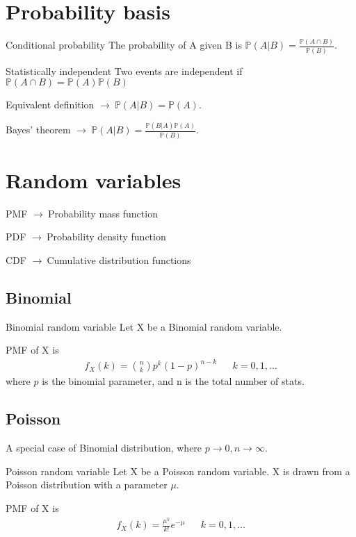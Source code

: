 \documentclass[11pt,a4paper]{article}
\numberwithin{equation}{section}
\newcommand{\prob}{\mathbb{P}}
\newcommand{\g}{$\rightarrow\ $}
\begin{document}
\clearpage


\section{Probability basis}

\begin{fact}{Conditional probability}{}
  The probability of A given B is $\prob(A|B) = \frac{\prob(A\cap B)}{\prob(B)}$.
\end{fact}

\begin{fact}{Statistically independent}{}
  Two events are independent if $\prob(A\cap B) = \prob(A)\prob(B)$
\end{fact}

Equivalent definition \g $\prob(A|B) = \prob(A)$.

\begin{fact}{Bayes’ theorem}{}
  \g $\prob(A|B) = \frac{\prob (B|A)\prob(A)}{\prob(B)}$.
\end{fact}

\section{Random variables}

PMF \g Probability mass function

PDF \g Probability density function

CDF \g Cumulative distribution functions

\subsection{Binomial}

\begin{fact}{Binomial random variable}{}
  Let X be a Binomial random variable.

  PMF of X is
  \begin{align}
    f_X(k) = \binom{n}{k}p^k(1-p)^{n-k} &&k=0,1,...
  \end{align}
  where $p$ is the binomial parameter, and n is the total number of stats.

\end{fact}

\subsection{Poisson}
A special case of Binomial distribution, where $p\rightarrow0,n\rightarrow\infty$.

\begin{fact}{Poisson random variable}{}
    Let X be a Poisson random variable.
    X is drawn from a Poisson distribution with a parameter $\mu$.

    PMF of X is
    \begin{align}
      f_X(k) =  \frac{\mu^k}{k!}e^{-\mu} && k = 0,1,...
    \end{align}
\end{fact}
\end{document}
